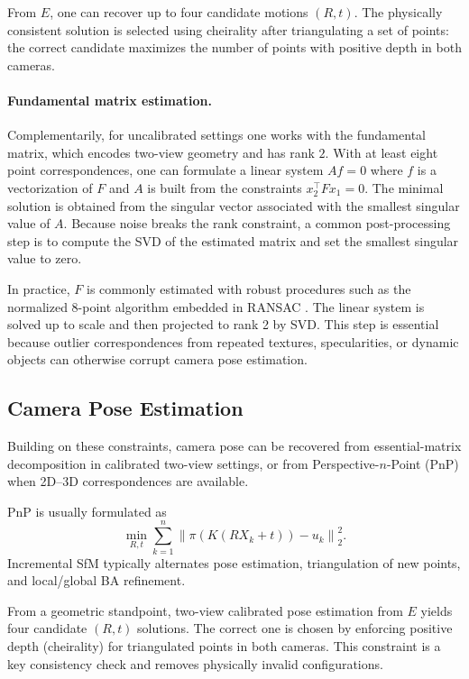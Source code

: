 \documentclass{report}
\begin{document}
From $E$, one can recover up to four candidate motions $(R,t)$. The physically consistent solution is selected using cheirality after triangulating a set of points: the correct candidate maximizes the number of points with positive depth in both cameras.

\paragraph{Fundamental matrix estimation.}
Complementarily, for uncalibrated settings one works with the fundamental matrix, which encodes two-view geometry and has rank $2$. With at least eight point correspondences, one can formulate a linear system $Af=0$ where $f$ is a vectorization of $F$ and $A$ is built from the constraints $x_2^\top F x_1=0$. The minimal solution is obtained from the singular vector associated with the smallest singular value of $A$. Because noise breaks the rank constraint, a common post-processing step is to compute the SVD of the estimated matrix and set the smallest singular value to zero.

In practice, $F$ is commonly estimated with robust procedures such as the normalized 8-point algorithm embedded in RANSAC \cite{fischler1981ransac}. The linear system is solved up to scale and then projected to rank 2 by SVD. This step is essential because outlier correspondences from repeated textures, specularities, or dynamic objects can otherwise corrupt camera pose estimation.

\subsection{Camera Pose Estimation}
Building on these constraints, camera pose can be recovered from essential-matrix decomposition in calibrated two-view settings, or from Perspective-$n$-Point (PnP) when 2D--3D correspondences are available.

PnP is usually formulated as
\[
\min_{R,t} \sum_{k=1}^{n}\left\|\pi\!\left(K(RX_k+t)\right)-u_k\right\|_2^2.
\]
Incremental SfM typically alternates pose estimation, triangulation of new points, and local/global BA refinement.

From a geometric standpoint, two-view calibrated pose estimation from $E$ yields four candidate $(R,t)$ solutions. The correct one is chosen by enforcing positive depth (cheirality) for triangulated points in both cameras. This constraint is a key consistency check and removes physically invalid configurations.
\end{document}
